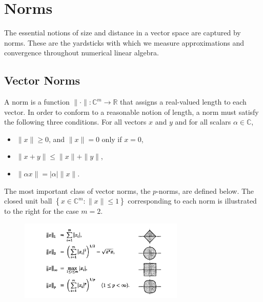 \chapter{Norms}
The essential notions of size and distance in a vector space are captured by norms. These are the yardsticks with which we measure approximations and convergence throughout numerical linear algebra.

\section{Vector Norms}

\begin{definition}
[Norm]
\label{def: Norm}
A norm is a function $\|\cdot\|: \mathbb{C}^m \rightarrow \mathbb{R}$ that assigns a real-valued length to each vector. In order to conform to a reasonable notion of length, a norm must satisfy the following three conditions. For all vectors $x$ and $y$ and for all scalars $\alpha \in \mathbb{C}$,
\begin{itemize}
    \item $\|x\| \geq 0$, and $\|x\|=0$ only if $x=0$,
    \item $\|x+y\| \leq\|x\|+\|y\|$,
    \item $\|\alpha x\|=|\alpha|\|x\|$.
\end{itemize}
\end{definition}

The most important class of vector norms, the $p$-norms, are defined below. The closed unit ball $\left\{x \in \mathbb{C}^m:\|x\| \leq 1\right\}$ corresponding to each norm is illustrated to the right for the case $m=2$.

\begin{figure}[H]
    \centering
    \includegraphics[width=0.7\textwidth]{figures/3-1.png}
\end{figure}

